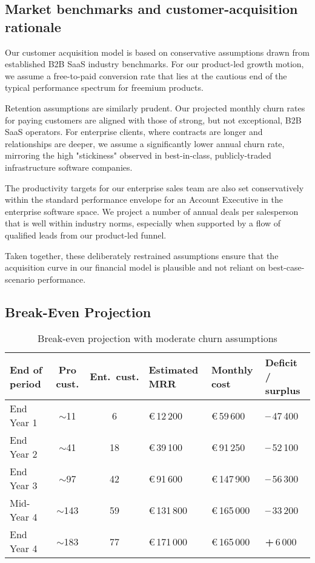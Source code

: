 \subsection{Market benchmarks and customer-acquisition rationale}

Our customer acquisition model is based on conservative assumptions drawn from established B2B SaaS industry benchmarks. For our product-led growth motion, we assume a free-to-paid conversion rate that lies at the cautious end of the typical performance spectrum for freemium products.

Retention assumptions are similarly prudent. Our projected monthly churn rates for paying customers are aligned with those of strong, but not exceptional, B2B SaaS operators. For enterprise clients, where contracts are longer and relationships are deeper, we assume a significantly lower annual churn rate, mirroring the high "stickiness" observed in best-in-class, publicly-traded infrastructure software companies.

The productivity targets for our enterprise sales team are also set conservatively within the standard performance envelope for an Account Executive in the enterprise software space. We project a number of annual deals per salesperson that is well within industry norms, especially when supported by a flow of qualified leads from our product-led funnel.

Taken together, these deliberately restrained assumptions ensure that the acquisition curve in our financial model is plausible and not reliant on best-case-scenario performance.


\subsection{Break-Even Projection}

\begin{table}[H]
\centering
\caption{Break-even projection with moderate churn assumptions}
\label{tab:break_even_moderate_churn}
\begin{tabularx}{\textwidth}{@{}l c c >{\raggedleft\arraybackslash}X
                                    >{\raggedleft\arraybackslash}X
                                    >{\raggedleft\arraybackslash}X@{}}
\toprule
\textbf{End of period} &
\textbf{Pro cust.} &
\textbf{Ent.\ cust.} &
\textbf{Estimated MRR} &
\textbf{Monthly cost} &
\textbf{Deficit / surplus} \\
\midrule
End Year 1  & $\sim$11  & 6  & \euro{}\,12\,200  & \euro{}\,59\,600  & \textbf{–}\,47\,400 \\
End Year 2  & $\sim$41  & 18 & \euro{}\,39\,100  & \euro{}\,91\,250  & \textbf{–}\,52\,100 \\
End Year 3  & $\sim$97  & 42 & \euro{}\,91\,600  & \euro{}\,147\,900 & \textbf{–}\,56\,300 \\
Mid-Year 4  & $\sim$143 & 59 & \euro{}\,131\,800 & \euro{}\,165\,000 & \textbf{–}\,33\,200 \\
End Year 4  & $\sim$183 & 77 & \euro{}\,171\,000 & \euro{}\,165\,000 & \textbf{+}\,6\,000  \\
\bottomrule
\end{tabularx}
\end{table}

